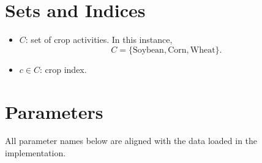 \section*{Sets and Indices}

\begin{itemize}
    \item $C$: set of crop activities. In this instance,
    \[
    C=\{\text{Soybean},\text{Corn},\text{Wheat}\}.
    \]
    \item $c \in C$: crop index.
\end{itemize}

\section*{Parameters}

All parameter names below are aligned with the data loaded in the implementation.

